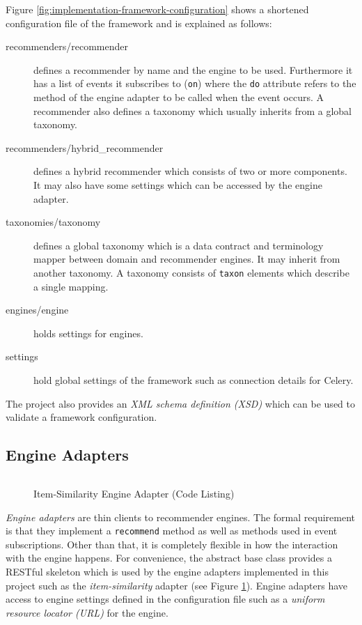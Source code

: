 Figure \ref{fig:implementation-framework-configuration} shows a shortened configuration file of the framework and is explained as follows:

\begin{description}
    \item[recommenders/recommender] defines a recommender by name and the engine to be used. Furthermore it has a list of events it subscribes to (\texttt{on}) where the \texttt{do} attribute refers to the method of the engine adapter to be called when the event occurs. A recommender also defines a taxonomy which usually inherits from a global taxonomy.
    \item[recommenders/hybrid_recommender] defines a hybrid recommender which consists of two or more components. It may also have some settings which can be accessed by the engine adapter.
    \item[taxonomies/taxonomy] defines a global taxonomy which is a data contract and terminology mapper between domain and recommender engines. It may inherit from another taxonomy. A taxonomy consists of \texttt{taxon} elements which describe a single mapping.
    \item[engines/engine] holds settings for engines.
    \item[settings] hold global settings of the framework such as connection details for Celery.
\end{description}

The project also provides an \emph{XML schema definition (XSD)} which can be used to validate a framework configuration.

\subsection{Engine Adapters}
\label{implementation-framework-engine-adapter}

\begin{figure}[!ht]
    \inputminted{py}{./includes/source/framework/engines/item\string_similarity.py}
    \caption{Item-Similarity Engine Adapter (Code Listing)}
    \label{fig:implementation-framework-engine-adapter}
\end{figure}

\emph{Engine adapters} are thin clients to recommender engines. The formal requirement is that they implement a \texttt{recommend} method as well as methods used in event subscriptions. Other than that, it is completely flexible in how the interaction with the engine happens. For convenience, the abstract base class provides a RESTful skeleton which is used by the engine adapters implemented in this project such as the \emph{item-similarity} adapter (see Figure \ref{fig:implementation-framework-engine-adapter}). Engine adapters have access to engine settings defined in the configuration file such as a \emph{uniform resource locator (URL)} for the engine.

